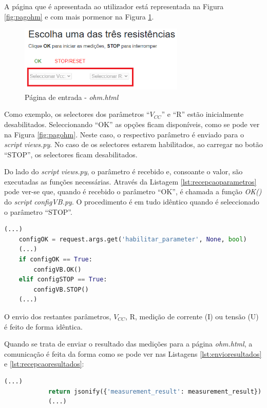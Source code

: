 A página que é apresentada ao utilizador está representada na Figura \ref{fig:pagohm} e com mais pormenor na Figura \ref{fig:introohm}.
\begin{figure}[hbtp]
	\centering
	\includegraphics[width=0.7\textwidth]{figures/parametros_desabilitados.png}
	\caption{Página de entrada - \textit{ohm.html}}
	\label{fig:introohm}
\end{figure}

Como exemplo, os selectores dos parâmetros ``$V_{CC}$'' e ``R'' estão inicialmente desabilitados. Seleccionando ``OK'' as opções ficam disponíveis, como se pode ver na Figura \ref{fig:pagohm}. Neste caso, o respectivo parâmetro é enviado para o \textit{script} \textit{views.py}. No caso de os selectores estarem habilitados, ao carregar no botão ``STOP'', os selectores ficam desabilitados.

Do lado do \textit{script} \textit{views.py}, o parâmetro é recebido e, consoante o valor, são executadas as funções necessárias. Através da Listagem \ref{lst:recepcaoparametros} pode ver-se que, quando é recebido o parâmetro ``OK'', é chamada a função \textit{OK()} do \textit{script} \textit{configVB.py}. O procedimento é em tudo idêntico quando é seleccionado o parâmetro ``STOP''.

\begin{minipage}{0.9\linewidth}
	\begin{lstlisting}[language=python, caption=Recepção de parâmetros enviados de \textit{ohm.html}, label=lst:recepcaoparametros]
	(...)
	configOK = request.args.get('habilitar_parameter', None, bool)
	(...)
	if configOK == True:
        configVB.OK()      
    elif configSTOP == True:
        configVB.STOP()	
	(...)
	\end{lstlisting}
\end{minipage}

O envio dos restantes parâmetros, $V_{CC}$, R, medição de corrente (I) ou tensão (U) é feito de forma idêntica.

Quando se trata de enviar o resultado das medições para a página \textit{ohm.html}, a comunicação é feita da forma como se pode ver nas Listagens \ref{lst:envioresultados} e \ref{lst:recepcaoresultados}:
\begin{center}
	\begin{minipage}{0.7\linewidth}
		\begin{lstlisting}[language=python, caption=Envio de resultados do servidor (\textit{views.py}) para a página \textit{ohm.html}, label=lst:envioresultados]
			(...)
			return jsonify({'measurement_result': measurement_result})
			(...)
	\end{lstlisting}
	\end{minipage}
\end{center}


